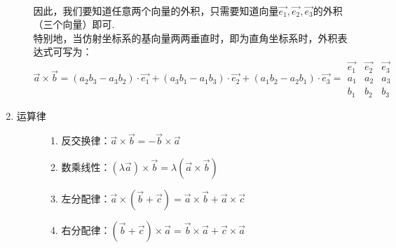 \begin{enumerate}[1.]
\begin{enumerate}[]
\begin{equation}
\begin{aligned}
			\end{aligned}
		\end{equation}
		\qquad 因此，我们要知道任意两个向量的外积，只需要知道向量$\overrightarrow{e_1},\overrightarrow{e_2},\overrightarrow{e_3}$的外积（三个向量）即可. \\
		\hspace*{2em}特别地，当仿射坐标系的基向量两两垂直时，即为直角坐标系时，外积表达式可写为：
		\begin{equation}
			\overrightarrow{a} \times \overrightarrow{b}=\left( a_2b_3-a_3b_2\right)\cdot \overrightarrow{e_1}+\left(a_3b_1-a_1b_3\right)\cdot  \overrightarrow{e_2}+\left(a_1b_2-a_2b_1\right)\cdot \overrightarrow{e_3} =\begin{array}{|ccc|}
				\overrightarrow{e_1}& \overrightarrow{e_2} & \overrightarrow{e_3} \\
				a_1 & a_2 & a_3 \\
				b_1 & b_2 & b_3
			\end{array}
		\end{equation}
	\end{enumerate}
			\item  {\color{dy2}运算律}
	\begin{figure}[h]
		\begin{minipage}{0.5\linewidth}
			\begin{enumerate}[i]
						\setlength{\itemindent}{1.5em} 
				\setlength{\topsep}{0.01em}
				\setlength{\itemsep}{0.01em}
				\item 反交换律：$\overrightarrow{a}\times \overrightarrow{b}=-\overrightarrow{b}\times \overrightarrow{a}$
				\item 数乘线性：$(\lambda \overrightarrow{a})\times \overrightarrow{b}=\lambda (\overrightarrow{a}\times \overrightarrow{b})$
				\item 左分配律：$\overrightarrow{a}\times (\overrightarrow{b}+\overrightarrow{c})=\overrightarrow{a}\times \overrightarrow{b}+\overrightarrow{a}\times \overrightarrow{c}$
				\item 右分配律：$(\overrightarrow{b}+\overrightarrow{c})\times \overrightarrow{a}=\overrightarrow{b}\times \overrightarrow{a}+ \overrightarrow{c}\times \overrightarrow{a} $
			\end{enumerate}
		\end{minipage}
		\hfill
		\begin{minipage}{0.4\linewidth}
			\centering

\end{minipage}
\end{figure}
\end{enumerate}
